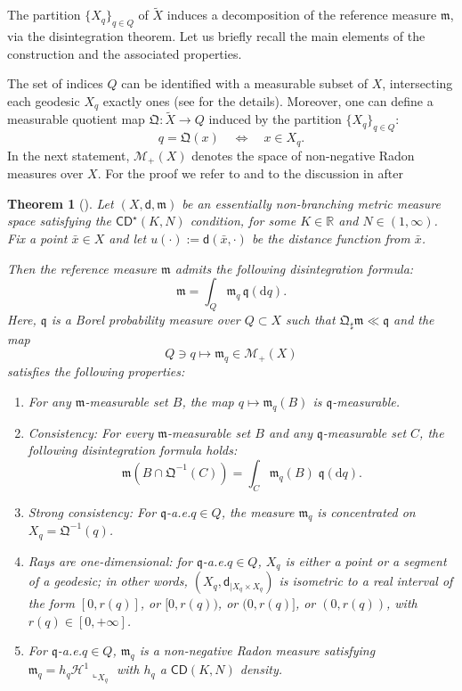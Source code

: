 \documentclass[12pt]{article}
\newcommand{\R}{\mathbb{R}}
\newcommand{\dd}{\mathrm{d}}
\newcommand{\CD}{\mathsf{CD}}
\newcommand{\mm}{\mathfrak m}
\newcommand{\di}{\mathsf{d}}
\newcommand{\sfd}{\mathsf d}
\theoremstyle{plain}
\newtheorem{theorem}[lemma]{Theorem}
\theoremstyle{definition}
\begin{document}
The partition $\{X_q\}_{q\in Q}$ of $\tilde{X}$ induces a decomposition of the reference measure $\mm$, via the disintegration theorem. Let us briefly recall the main elements of the construction and the associated properties.

The set of indices $Q$ can be identified with a measurable subset of $X$, intersecting each geodesic $X_q$ exactly ones (see \cite[Sect.\,3.1]{cavalletti-mondino-apde} for the details).
Moreover, one can define a measurable quotient map $\mathfrak{Q}:\tilde{X}\to Q$ induced by the partition  $\{X_q\}_{q\in Q}$:
%
\begin{equation}\label{eq:defQuotMap}
q=\mathfrak{Q}(x) \quad \Longleftrightarrow\quad x\in X_q.
\end{equation}
%
In the next statement,  $\mathcal{M}_+(X)$ denotes the space of non-negative Radon measures over $X$. For the proof we refer to \cite[Thm.]{cavalletti-mondino-apde} and to the discussion in  \cite[Sec.\,3.B]{cavalletti-mondino-apde} after  \cite[Thm.\,5.1]{cavalletti-mondino-inv}


\begin{theorem}[\cite{cavalletti-mondino-inv,cavalletti-mondino-apde}]\label{th: loc}
Let $(X,\di,\mm)$ be an essentially non-branching metric measure space satisfying the $\mathsf{CD}^{\star}(K,N)$ condition, for some $K\in \R$ and $N\in (1,\infty)$.
Fix a point $\bar{x}\in X$ and let $u(\cdot):=\sfd(\bar{x}, \cdot)$ be the distance function from $\bar{x}$.

Then the reference measure $\mm$ admits the following disintegration formula:
\begin{equation}\label{eq:Dismm}
\mm=\int_Q \mm_{q}\,\mathfrak{q}(\dd q).
\end{equation}
Here, $\mathfrak{q}$ is a Borel probability measure over $Q\subset X$ such that $\mathfrak{Q}_{\sharp}\mm\ll \mathfrak{q}$ and the map
$$
Q\ni q \mapsto \mm_q \in \mathcal{M}_+(X)
$$
satisfies the following properties:
\begin{enumerate}
\item For any $\mm$-measurable set $B$, the map $q\mapsto \mm_q(B)$ is $\mathfrak{q}$-measurable.
\item \emph{Consistency}: For every  $\mm$-measurable set $B$ and any  $\mathfrak{q}$-measurable set $C$, the following disintegration formula holds:
$$
\mm(B\cap \mathfrak{Q}^{-1}(C))=\int_C\mm_q(B)\; \mathfrak{q}(\dd q).
$$
\item \emph{Strong consistency}: For $\mathfrak{q}$-a.e.\;$q\in Q$, the measure $\mm_q$ is concentrated on $X_q=\mathfrak{Q}^{-1}(q)$.
\item \emph{Rays are one-dimensional}: for $ \mathfrak{q}$-a.e.\;$q\in Q$, $X_q$ is either a point or a segment of a geodesic; in other words, $(X_q, \sfd_{| X_q\times X_q})$ is isometric to a real interval of the form $[0, r(q)]$, or $[0, r(q))$, or $(0, r(q)]$, or $(0, r(q))$, with $r(q)\in [0,+\infty]$.
\item For $\mathfrak{q}$-a.e.\;$q\in Q$, $\mm_{q}$ is a non-negative Radon measure satisfying $\mm_{q}=h_{q}\mathcal{H}^1\llcorner_{X_{q}}$ with $h_{q}$ a $\CD(K,N)$ density.
\end{enumerate}
\end{theorem}
\end{document}
